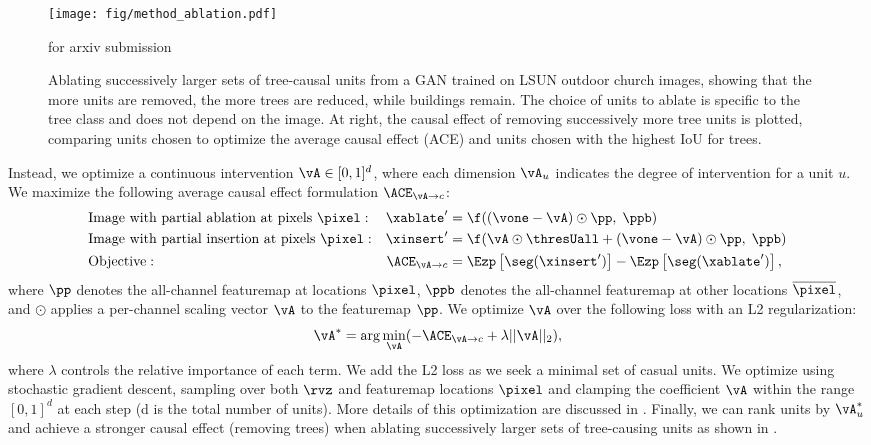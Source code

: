 \documentclass{article} %
\def\arxiv{for arxiv submission}
\begin{document}
\begin{figure}[t]
\centering
\texttt{[image: fig/method\_ablation.pdf]}
\vspace{-18pt}
\caption{
Ablating successively larger sets of tree-causal units from a GAN trained on LSUN outdoor church images, showing that the more units are removed, the more trees are reduced, while buildings remain. The choice of units to ablate is specific to the tree class and does not depend on the image.  At right, the causal effect of removing successively more tree units is plotted, comparing units chosen to optimize the average causal effect (ACE) and units chosen with the highest IoU for trees.}
\ifdefined\arxiv
\vspace{-10pt}
\else
\vspace{-7pt}
\fi
\end{figure}%
Instead, we optimize a continuous intervention  $\vA \in [0, 1]^{d}$, where each dimension $\vA_u$ indicates the degree of intervention for a unit $u$. We maximize the following average causal effect formulation $\ACE_{\vA\rightarrow c}$:
\begin{align}
\label{eq:aceopt}
&\text{Image with partial ablation at pixels $\pixel$}: &  \xablate' & = \f((\vone-\vA) \odot \pp, \; \ppb) \\ \nonumber
&\text{Image with partial insertion at pixels $\pixel$}: & \xinsert' & = \f(\vA \odot \thresUall + (\vone-\vA) \odot \pp, \; \ppb) \\ \nonumber
&\text{Objective}: & \ACE_{\vA\rightarrow c} & = \Ezp\left[ \seg(\xinsert')\right] - \Ezp\left[ \seg(\xablate')\right],
\end{align}
where $\pp$ denotes the all-channel featuremap at locations $\pixel$, $\ppb$ denotes the all-channel featuremap at other locations $\overline{\pixel}$, and $\odot$ applies a per-channel scaling vector $\vA$ to the featuremap $\pp$. 
 We optimize $\vA$ over the following loss with an L2 regularization:
\begin{equation}
\vA^* = \arg \min_{\vA} (-\ACE_{\vA \rightarrow c} + \lambda ||\vA||_2),
\label{eq:acemax}
\end{equation}
where $\lambda$ controls the relative importance of each term. We add the L2 loss as we seek a minimal set of casual units. We optimize using stochastic gradient descent, sampling over both $\rvz$ and featuremap locations $\pixel$ and clamping the coefficient $\vA$ within the range $[0, 1]^d$ at each step (d is the total number of units).   More details of this optimization are discussed in .
Finally, we can rank units by $\vA_u^*$ and achieve a stronger causal effect (\ie removing trees) when ablating successively larger sets of tree-causing units as shown in . 
\end{document}

